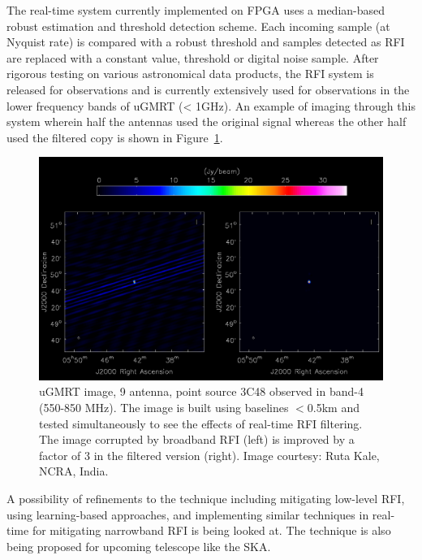 \begin{itemize}
The real-time system currently implemented on FPGA \cite{buch2019real} uses a median-based robust estimation and threshold detection scheme. Each incoming sample (at Nyquist rate) is compared with a robust threshold and samples detected as RFI are replaced with a constant value, threshold or digital noise sample. After rigorous testing on various astronomical data products, the RFI system is released for observations and is currently extensively used for observations in the lower frequency bands of uGMRT (< 1GHz). An example of imaging through this system wherein half the antennas used the original signal whereas the other half used the filtered copy \cite{buch2022performance} is shown in Figure~\ref{fig:ugmrt-b4-image}. \\

\begin{figure}
    \includegraphics[scale=0.4]{Hardware Excision Techniques/figures/band4_point_source_rfi_filtering.png}
    \caption{uGMRT image, 9 antenna, point source 3C48 observed in band-4 (550-850 MHz). The image is built using baselines $<$0.5km and tested simultaneously to see the effects of real-time RFI filtering. The image corrupted by broadband RFI (left) is improved by a factor of 3 in the filtered version (right). Image courtesy: Ruta Kale, NCRA, India.
}
    \label{fig:ugmrt-b4-image}
\end{figure}

A possibility of refinements to the technique including mitigating low-level RFI, using learning-based approaches, and implementing similar techniques in real-time for mitigating narrowband RFI \cite{buch2016real} is being looked at. The technique is also being proposed \cite{buch2023real}for upcoming telescope like the SKA.\\



\end{itemize}
